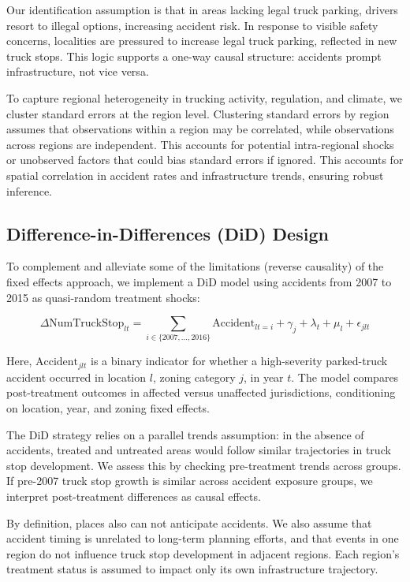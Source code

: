 \documentclass[
  12pt]{article}
\begin{document}
Our identification assumption is that in areas lacking legal truck
parking, drivers resort to illegal options, increasing accident risk. In
response to visible safety concerns, localities are pressured to
increase legal truck parking, reflected in new truck stops. This logic
supports a one-way causal structure: accidents prompt infrastructure,
not vice versa.

To capture regional heterogeneity in trucking activity, regulation, and
climate, we cluster standard errors at the region level. Clustering
standard errors by region assumes that observations within a region may
be correlated, while observations across regions are independent. This
accounts for potential intra-regional shocks or unobserved factors that
could bias standard errors if ignored. This accounts for spatial
correlation in accident rates and infrastructure trends, ensuring robust
inference.

\subsection{Difference-in-Differences (DiD)
Design}\label{difference-in-differences-did-design}

To complement and alleviate some of the limitations (reverse causality)
of the fixed effects approach, we implement a DiD model using accidents
from 2007 to 2015 as quasi-random treatment shocks:

\[
\Delta \text{NumTruckStop}_{lt} = \sum_{i \in \{2007, ..., 2016\}} \text{Accident}_{lt=i} + \gamma_j + \lambda_t + \mu_l + \epsilon_{jlt}
\]

Here, \(\text{Accident}_{jlt}\) is a binary indicator for whether a
high-severity parked-truck accident occurred in location \(l\), zoning
category \(j\), in year \(t\). The model compares post-treatment
outcomes in affected versus unaffected jurisdictions, conditioning on
location, year, and zoning fixed effects.

The DiD strategy relies on a parallel trends assumption: in the absence
of accidents, treated and untreated areas would follow similar
trajectories in truck stop development. We assess this by checking
pre-treatment trends across groups. If pre-2007 truck stop growth is
similar across accident exposure groups, we interpret post-treatment
differences as causal effects.

By definition, places also can not anticipate accidents. We also assume
that accident timing is unrelated to long-term planning efforts, and
that events in one region do not influence truck stop development in
adjacent regions. Each region's treatment status is assumed to impact
only its own infrastructure trajectory.
\end{document}

